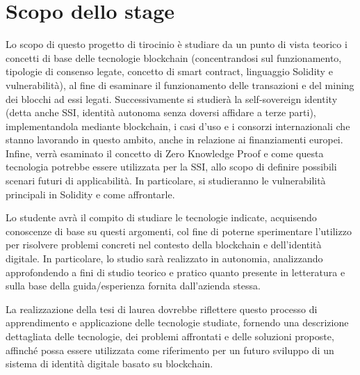 \section*{Scopo dello stage}
Lo scopo di questo progetto di tirocinio è studiare da un punto di vista teorico
i concetti di base delle tecnologie blockchain (concentrandosi sul funzionamento, tipologie di consenso legate,
concetto di smart contract, linguaggio Solidity e vulnerabilità), al fine di esaminare il funzionamento delle transazioni
e del mining dei blocchi ad essi legati.
Successivamente si studierà la self-sovereign identity (detta anche SSI, identità autonoma senza doversi affidare a terze parti), implementandola
mediante blockchain, i casi d'uso e i consorzi internazionali che stanno lavorando in questo ambito, anche in relazione ai finanziamenti europei.
Infine, verrà esaminato il concetto di Zero Knowledge Proof e come questa tecnologia potrebbe essere utilizzata per la SSI, allo scopo di definire 
possibili scenari futuri di applicabilità. In particolare, si studieranno le vulnerabilità principali in Solidity e come affrontarle.

\medskip

Lo studente avrà il compito di studiare le tecnologie indicate, acquisendo conoscenze di base su questi argomenti, col fine di poterne sperimentare l'utilizzo per risolvere problemi concreti nel contesto della blockchain e dell'identità digitale.
In particolare, lo studio sarà realizzato in autonomia, analizzando approfondendo a fini di studio teorico e pratico 
quanto presente in letteratura e sulla base della guida/esperienza fornita dall'azienda stessa.

\medskip
La realizzazione della tesi di laurea dovrebbe riflettere questo processo di apprendimento e applicazione delle tecnologie studiate, fornendo una descrizione dettagliata delle tecnologie, dei problemi affrontati e delle soluzioni proposte,
affinché possa essere utilizzata come riferimento per un futuro sviluppo di un sistema di identità digitale basato su blockchain.

\newpage


